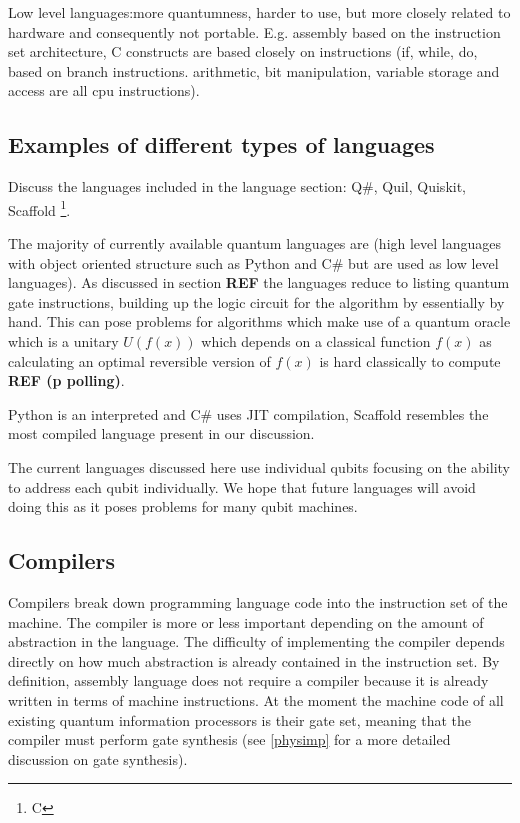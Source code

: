 Low level languages:more quantumness, harder to use, but more closely related to hardware and consequently not portable. E.g. assembly based on the instruction set architecture, C constructs are based closely on instructions (if, while, do, based on branch instructions. arithmetic, bit manipulation, variable storage and access are all cpu instructions).

\subsection{Examples of different types of languages}

Discuss the languages included in the language section: Q\#, Quil, Quiskit, Scaffold \footnote{C}. 

The majority of currently available quantum languages are (high level languages with object oriented structure such as Python and C\# but are used as low level languages). As discussed in section \textbf{REF} the languages reduce to listing quantum gate instructions, building up the logic circuit for the algorithm by essentially by hand. This can pose problems for algorithms which make use of a quantum oracle which is a unitary $U(f(x))$ which depends on a classical function $f(x)$ as calculating an optimal reversible version of $f(x)$ is hard classically to compute \textbf{REF (p polling)}.

Python is an interpreted and C\# uses JIT compilation, Scaffold resembles the most compiled language present in our discussion. 

The current languages discussed here use individual qubits focusing on the ability to address each qubit individually. We hope that future languages will avoid doing this as it poses problems for many qubit machines.

\subsection{Compilers}

Compilers break down programming language code into the instruction set of the machine. The compiler is more or less important depending on the amount of abstraction in the language. The difficulty of implementing the compiler depends directly on how much abstraction is already contained in the instruction set. By definition, assembly language does not require a compiler because it is already written in terms of machine instructions. At the moment the machine code of all existing quantum information processors is their gate set, meaning that the compiler must perform gate synthesis (see \autoref{physimp} for a more detailed discussion on gate synthesis). 

